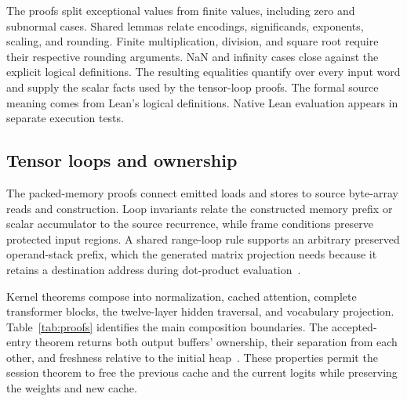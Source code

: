 \documentclass[11pt]{article}
\begin{document}
The proofs split exceptional values from finite values, including zero and subnormal cases.  Shared lemmas relate encodings, significands, exponents, scaling, and rounding.  Finite multiplication, division, and square root require their respective rounding arguments.  NaN and infinity cases close against the explicit logical definitions.  The resulting equalities quantify over every input word and supply the scalar facts used by the tensor-loop proofs.  The formal source meaning comes from Lean's logical definitions.  Native Lean evaluation appears in separate execution tests.

\subsection{Tensor loops and ownership}

The packed-memory proofs connect emitted loads and stores to source byte-array reads and construction.  Loop invariants relate the constructed memory prefix or scalar accumulator to the source recurrence, while frame conditions preserve protected input regions.  A shared range-loop rule supports an arbitrary preserved operand-stack prefix, which the generated matrix projection needs because it retains a destination address during dot-product evaluation~\cite{loops}.

Kernel theorems compose into normalization, cached attention, complete transformer blocks, the twelve-layer hidden traversal, and vocabulary projection.  Table~\ref{tab:proofs} identifies the main composition boundaries.  The accepted-entry theorem returns both output buffers' ownership, their separation from each other, and freshness relative to the initial heap~\cite{entry}.  These properties permit the session theorem to free the previous cache and the current logits while preserving the weights and new cache.
\end{document}
